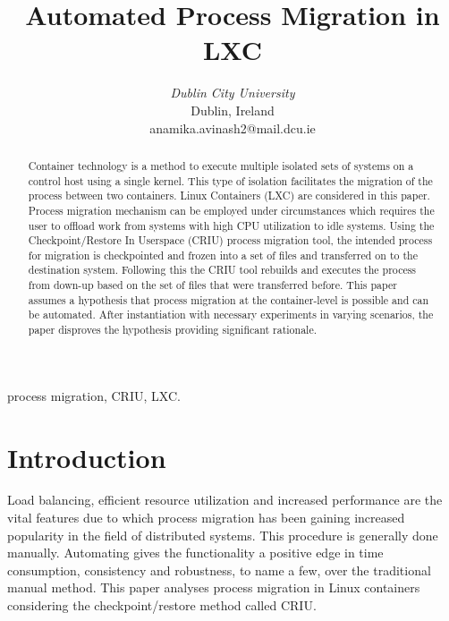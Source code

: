 \documentclass[conference]{IEEEtran}
\begin{document}
\title{Automated Process Migration in LXC}

\author{
\textit{Dublin City University}\\
Dublin, Ireland \\
anamika.avinash2@mail.dcu.ie
}

\maketitle

\begin{abstract}
Container technology is a method to execute multiple isolated sets of systems on a control host using a single kernel. This type of isolation facilitates the migration of the process between two containers. Linux Containers (LXC) are considered in this paper. Process migration mechanism can be employed under circumstances which requires the user to offload work from systems with high CPU utilization to idle systems. Using the Checkpoint/Restore In Userspace (CRIU) process migration tool, the intended process for migration is checkpointed and frozen into a set of files and transferred on to the destination system. Following this the CRIU tool rebuilds and executes the process from down-up based on the set of files that were transferred before. This paper assumes a hypothesis that process migration at the container-level is possible and can be automated. After instantiation with necessary experiments in varying scenarios, the paper disproves the hypothesis providing significant rationale.  

\end{abstract}

\begin{IEEEkeywords}
process migration, CRIU, LXC.
\end{IEEEkeywords}

\section{Introduction}
\label{sec: 1.introduction}
Load balancing, efficient resource utilization and increased performance are the vital features due to which process migration has been gaining increased popularity in the field of distributed systems. This procedure is generally done manually. Automating gives the functionality a positive edge in time consumption, consistency and robustness, to name a few, over the traditional manual method. This paper analyses process migration in Linux containers considering the checkpoint/restore method called CRIU.
\end{document}
